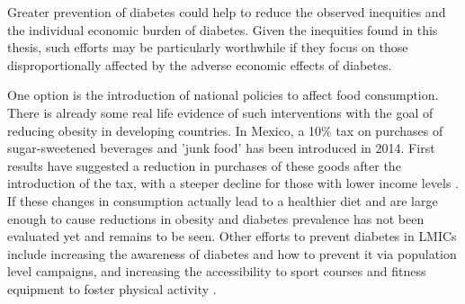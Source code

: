 Greater prevention of diabetes could help to reduce the observed inequities and the individual economic burden of diabetes. Given the inequities found in this thesis, such efforts may be particularly worthwhile if they focus on those disproportionally affected by the adverse economic effects of diabetes.

One option is the introduction of national policies to affect food consumption. There is already some real life evidence of such interventions with the goal of reducing obesity in developing countries. In Mexico, a 10\% tax on purchases of sugar-sweetened beverages and 'junk food' has been introduced in 2014. First results have suggested a reduction in purchases of these goods after the introduction of the tax, with a steeper decline for those with lower income levels \parencite{Colchero2016,Batis2016}. If these changes in consumption actually lead to a healthier diet and are large enough to cause reductions in obesity and diabetes prevalence has not been evaluated yet and remains to be seen. Other efforts to prevent diabetes in \acp{LMIC} include increasing the awareness of diabetes and how to prevent it via population level campaigns, and  increasing the accessibility to sport courses and fitness equipment to foster physical activity \parencite{Cefalu2016}. 

